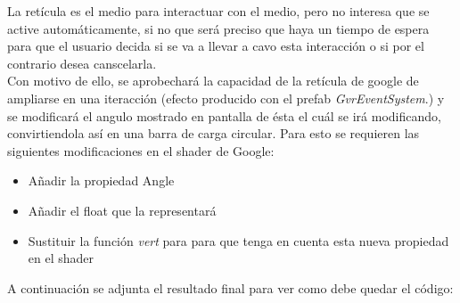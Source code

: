\quad La retícula es el medio para interactuar con el medio, pero no interesa que se active automáticamente, si no que será preciso que haya un tiempo de espera para que el usuario decida si se va a llevar a cavo esta interacción o si por el contrario desea canscelarla.\\

\quad Con motivo de ello, se aprobechará la capacidad de la retícula de google de ampliarse en una iteracción (efecto producido con el prefab \textit{GvrEventSystem}.) y se modificará el angulo mostrado en pantalla de ésta el cuál se irá modificando, convirtiendola así en una barra de carga circular. Para esto se requieren las siguientes modificaciones en el shader de Google:

\begin{itemize}
	\item Añadir la propiedad Angle
	\item Añadir el float que la representará
	\item Sustituir la función \textit{vert} para para que tenga en cuenta esta nueva propiedad en el shader 
\end{itemize}

\quad A continuación se adjunta el resultado final para ver como debe quedar el código:

